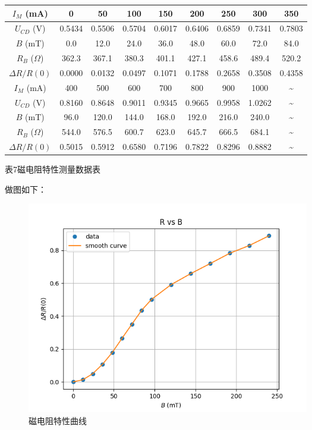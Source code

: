 \documentclass[UTF8]{ctexart}
\begin{document}
\begin{center}
    \begin{tabular}{|c|c|c|c|c|c|c|c|c|}
        \hline
        $I_M$ (mA) & 0 & 50 & 100 & 150 & 200 & 250 & 300 & 350 \\\hline
        $U_{CD}$ (V) & 0.5434 & 0.5506 & 0.5704 & 0.6017 & 0.6406 & 0.6859 & 0.7341 & 0.7803 \\\hline
        $B$ (mT) & 0.0 & 12.0 & 24.0 & 36.0 & 48.0 & 60.0 & 72.0 & 84.0 \\\hline
        $R_B$ ($\Omega$) & 362.3 & 367.1 & 380.3 & 401.1 & 427.1 & 458.6 & 489.4 & 520.2 \\\hline
        $\Delta R/R(0)$ & 0.0000 & 0.0132 & 0.0497 & 0.1071 & 0.1788 & 0.2658 & 0.3508 & 0.4358 \\\hline
        \hline
        $I_M$ (mA) & 400 & 500 & 600 & 700 & 800 & 900 & 1000 & \~{}\\\hline
        $U_{CD}$ (V) & 0.8160 & 0.8648 & 0.9011 & 0.9345 & 0.9665 & 0.9958 & 1.0262 & \~{} \\\hline
        $B$ (mT) & 96.0 & 120.0 & 144.0 & 168.0 & 192.0 & 216.0 & 240.0 & \~{} \\\hline
        $R_B$ ($\Omega$) & 544.0 & 576.5 & 600.7 & 623.0 & 645.7 & 666.5 & 684.1 & \~{} \\\hline
        $\Delta R/R(0)$ & 0.5015 & 0.5912 & 0.6580 & 0.7196 & 0.7822 & 0.8296 & 0.8882 & \~{} \\\hline
    \end{tabular}
    \begin{minipage}{0.8\textwidth}
        \centering
        \fontsize{9pt}{\baselineskip}\selectfont
        表7\quad 磁电阻特性测量数据表
    \end{minipage}
\end{center}

做图如下：

\begin{center}
    \begin{figure}[H]
        \centering
        \includegraphics[width=0.6\textwidth]{img/Magnetoresistance.png}
        \caption{磁电阻特性曲线}
        \label{Magnetoresistance}
    \end{figure}
\end{center}
\end{document}
